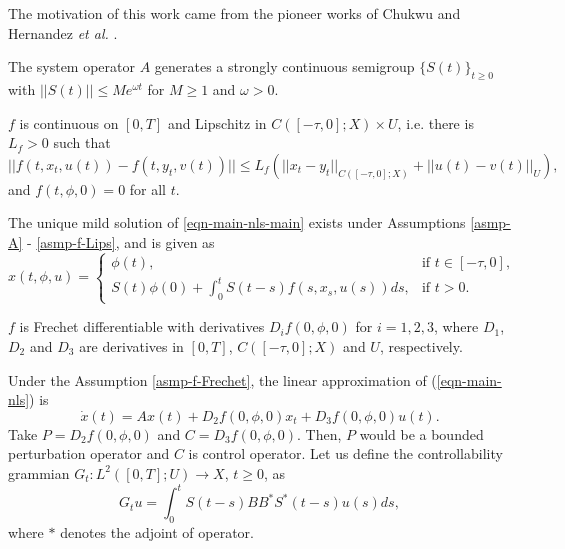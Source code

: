 \documentclass[12pt]{llncs}
\begin{document}
The motivation of this work came from the pioneer works of Chukwu \cite{Chukwu91delay} and Hernandez \emph{et al.} \cite{hernandez2020alka}.

\begin{asmp}\label{asmp-A}
The system operator $A$ generates a strongly continuous semigroup $\{S(t)\}_{t \ge 0}$ with $||S(t)|| \le M e^{\omega t}$ for $M \ge 1$ and $\omega > 0$.
\end{asmp}

\begin{asmp}\label{asmp-f-Lips}
$f$ is continuous on $[0,T]$ and Lipschitz in $C([-\tau,0];X) \times U$, i.e. there is $L_f > 0$ such that
        \begin{equation*}
          ||f(t,x_t,u(t)) - f(t,y_t,v(t))|| \le L_f (||x_t - y_t||_{C([-\tau,0];X)} + ||u(t) - v(t)||_U),
        \end{equation*}
                and $f(t,\phi,0)=0$ for all $t$.
\end{asmp}

The unique mild solution of \eqref{eqn-main-nls-main} exists under Assumptions \ref{asmp-A} - \ref{asmp-f-Lips}, and is given as
\begin{equation*}
x(t,\phi,u) = \begin{cases}
                \phi(t), & \mbox{if } t \in [-\tau,0], \\
                S(t)\phi(0) + \int_{0}^{t} S(t-s) f(s,x_s,u(s))ds , & \mbox{if } t > 0.
              \end{cases}
\end{equation*}

\begin{asmp}\label{asmp-f-Frechet}
$f$ is Frechet differentiable %
with derivatives $D_i f(0,\phi,0)$ for $i = 1,2,3$, where $D_1$, $D_2$ and $D_3$ are derivatives in $[0,T]$, $C([-\tau,0];X)$ and $U$, respectively.
\end{asmp}

Under the Assumption \ref{asmp-f-Frechet}, the linear approximation of (\ref{eqn-main-nls}) is
\begin{equation}\label{eqn-lin-approx}
\dot{x}(t) = A x(t) + D_2 f(0,\phi,0)x_t + D_3 f(0,\phi,0)u(t).
\end{equation}
Take $P = D_2 f(0,\phi,0)$ and $C = D_3 f(0,\phi,0)$. Then, $P$ would be a bounded perturbation operator and $C$ is control operator. Let us define the controllability grammian $G_t : L^2([0,T];U) \rightarrow X$, $t \ge 0$, as
\begin{equation}\label{eqn-cg-dfn}
G_t u = \int_{0}^{t} S(t-s) B B^* S^*(t-s)u(s)ds,
\end{equation}
where $*$ denotes the adjoint of operator.
\end{document}
